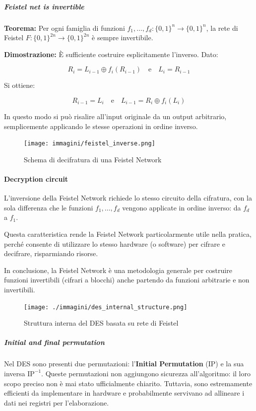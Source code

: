 \documentclass{report}
\begin{document}
\subparagraph{Feistel net is invertible}

\textbf{Teorema:} Per ogni famiglia di funzioni $f_1, \dots, f_d : \{0,1\}^n \rightarrow \{0,1\}^n$, la rete di Feistel $F : \{0,1\}^{2n} \rightarrow \{0,1\}^{2n}$ è sempre invertibile.

\textbf{Dimostrazione:} È sufficiente costruire esplicitamente l'inverso. Dato:

\[
R_i = L_{i-1} \oplus f_i(R_{i-1})
\quad \text{e} \quad
L_i = R_{i-1}
\]

Si ottiene:

\[
R_{i-1} = L_i
\quad \text{e} \quad
L_{i-1} = R_i \oplus f_i(L_i)
\]

In questo modo si può risalire all’input originale da un output arbitrario, semplicemente applicando le stesse operazioni in ordine inverso.

\begin{figure}[h]
\centering
\texttt{[image: immagini/feistel\_inverse.png]}
\caption{Schema di decifratura di una Feistel Network}
\end{figure}

\paragraph{Decryption circuit}

L’inversione della Feistel Network richiede lo stesso circuito della cifratura, con la sola differenza che le funzioni $f_1, \dots, f_d$ vengono applicate in ordine inverso: da $f_d$ a $f_1$.

Questa caratteristica rende la Feistel Network particolarmente utile nella pratica, perché consente di utilizzare lo stesso hardware (o software) per cifrare e decifrare, risparmiando risorse.

In conclusione, la Feistel Network è una metodologia generale per costruire funzioni invertibili (cifrari a blocchi) anche partendo da funzioni arbitrarie e non invertibili.

\begin{figure}[h]
\centering
\texttt{[image: ./immagini/des\_internal\_structure.png]}
\caption{Struttura interna del DES basata su rete di Feistel}
\end{figure}

\subparagraph{Initial and final permutation}

Nel DES sono presenti due permutazioni: l’\textbf{Initial Permutation} (IP) e la sua inversa $\text{IP}^{-1}$. Queste permutazioni non aggiungono sicurezza all’algoritmo: il loro scopo preciso non è mai stato ufficialmente chiarito. Tuttavia, sono estremamente efficienti da implementare in hardware e probabilmente servivano ad allineare i dati nei registri per l'elaborazione.
\end{document}
